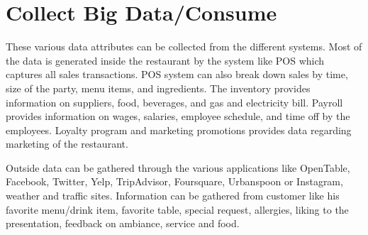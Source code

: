 \documentclass[sigconf]{acmart}
\begin{document}
\section{Collect Big Data/Consume}
These various data attributes can be collected from the different systems. Most of the data is generated inside the restaurant by the system like POS which captures all sales transactions. POS system can also break down sales by time, size of the party, menu items, and ingredients. The inventory provides information on suppliers, food, beverages, and gas and electricity bill. Payroll provides information on wages, salaries, employee schedule, and time off by the employees. Loyalty program and marketing promotions provides data regarding marketing of the restaurant.


Outside data can be gathered through the various applications like OpenTable, Facebook, Twitter, Yelp, TripAdvisor, Foursquare, Urbanspoon or Instagram, weather and traffic sites. Information can be gathered from customer like his favorite menu/drink item, favorite table, special request, allergies, liking to the presentation, feedback on ambiance, service and food. \cite{www-restaurant}
\end{document}
